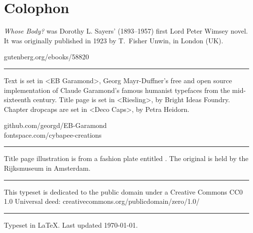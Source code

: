 \documentclass[
paper=5.5in:8.5in
]{scrbook}
\begin{document}
\chapter*{Colophon}
\begin{center}
\begin{minipage}{\textwidth}
\textit{Whose Body?} was Dorothy L. Sayers' (1893--1957) first Lord Peter Wimsey novel. It was originally published in 1923 by T.~Fisher Unwin, in London (UK).
\end{minipage}
\vfill
gutenberg.org/ebooks/58820
\vfill
\rule{0.5\textwidth}{.4pt}
\vfill
\begin{minipage}{\textwidth}
Text is set in <EB Garamond>, Georg Mayr-Duffner's free and open source implementation of Claude Garamond’s famous humanist typefaces from the mid-sixteenth century. Title page is set in <Riesling>, by Bright Ideas Foundry. Chapter dropcaps are set in <Deco Caps>, by Petra Heidorn.
\end{minipage}
\vfill
github.com/georgd/EB-Garamond\\fontspace.com/cybapee-creations
\vfill
\rule{0.5\textwidth}{.4pt}
\vfill
\begin{minipage}{\textwidth}
Title page illustration is from a fashion plate entitled . The original is held by the Rijksmuseum in Amsterdam.
\end{minipage}
\vfill
\rule{0.5\textwidth}{.4pt}
\vfill
\begin{minipage}{\textwidth}
This typeset is dedicated to the public domain under a Creative Commons CC0 1.0 Universal deed: creativecommons.org/publicdomain/zero/1.0/
\end{minipage}
\vfill
\rule{0.5\textwidth}{.4pt}
\vfill
Typeset in \LaTeX{}. Last updated \today.
\end{center}
\thispagestyle{empty}
\end{document}
